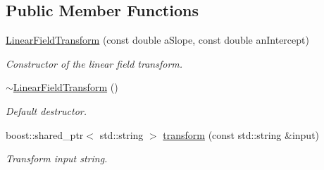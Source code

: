 \subsection*{Public Member Functions}
\begin{DoxyCompactItemize}
\item 
\hyperlink{classtudat_1_1input__output_1_1LinearFieldTransform_a173895df536ab1093933d10b7179c1fc}{Linear\+Field\+Transform} (const double a\+Slope, const double an\+Intercept)
\begin{DoxyCompactList}\small\item\em Constructor of the linear field transform. \end{DoxyCompactList}\item 
\hyperlink{classtudat_1_1input__output_1_1LinearFieldTransform_adf9338f10e39cc585d4ef9e7e7ccd9f1}{$\sim$\+Linear\+Field\+Transform} ()\hypertarget{classtudat_1_1input__output_1_1LinearFieldTransform_adf9338f10e39cc585d4ef9e7e7ccd9f1}{}\label{classtudat_1_1input__output_1_1LinearFieldTransform_adf9338f10e39cc585d4ef9e7e7ccd9f1}

\begin{DoxyCompactList}\small\item\em Default destructor. \end{DoxyCompactList}\item 
boost\+::shared\+\_\+ptr$<$ std\+::string $>$ \hyperlink{classtudat_1_1input__output_1_1LinearFieldTransform_ac4bb87a66f329fc36999f8fd78d477e4}{transform} (const std\+::string \&input)
\begin{DoxyCompactList}\small\item\em Transform input string. \end{DoxyCompactList}\end{DoxyCompactItemize}

